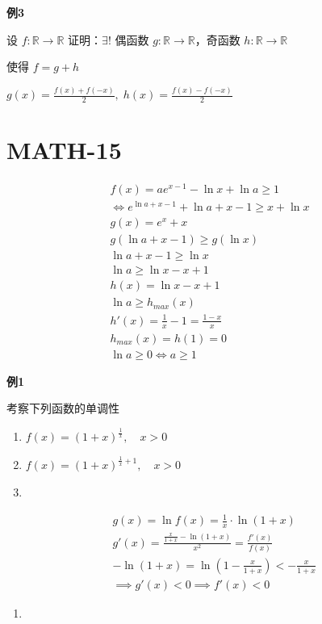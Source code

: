 \textbf{例3}

设 \(f:\mathbb{R}\to \mathbb{R}\) 证明：\(\exists!\) 偶函数
\(g:\mathbb{R}\to \mathbb{R}\)，奇函数 \(h:\mathbb{R}\to \mathbb{R}\)

使得 \(f=g+h\)

\(g(x)=\frac{f(x)+f(-x)}{2}, \; h(x)=\frac{f(x)-f(-x)}{2}\)

\section{MATH-15}\label{math-15}

\[
\begin{aligned}
f(x)=ae^{x-1}-\ln x+\ln a \geq 1 \\ 
\iff e ^{\ln a+x-1} +\ln a+x-1\geq x+\ln x\\
g(x)=e^{x}+x\\
g(\ln a+x-1)\geq g(\ln x)\\
\ln a+x-1\geq \ln x\\
\ln a\geq \ln x-x+1\\
h(x)=\ln x-x+1\\
\ln a\geq h_{max}(x)\\
h'(x)=\frac{1}{x}-1=\frac{1-x}{x}\\
h_{max}(x)=h(1)=0\\
\ln a\geq 0 \iff a\geq 1
\end{aligned}
\]

\textbf{例1}

考察下列函数的单调性

\begin{enumerate}
\def\labelenumi{\arabic{enumi}.}
\item
  \(f(x)=(1+x)^{\frac{1}{x}}, \quad x>0\)
\item
  \(f(x)=(1+x)^{\frac{1}{x}+1}, \quad x>0\)
\item
\end{enumerate}

\[
\begin{aligned}
&g(x) = \ln f(x) = \frac{1}{x} \cdot \ln (1+x)\\
&g'(x) = \frac{\frac{x}{1+x}-\ln(1+x)}{x^{2}} = \frac{f'(x)}{f(x)}\\
&-\ln(1+x)=\ln\left( 1-\frac{x}{1+x} \right)< -\frac{x}{1+x} \\
&\implies g'(x)<0 \implies f'(x)<0
\end{aligned}
\]

\begin{enumerate}
\def\labelenumi{\arabic{enumi}.}
\setcounter{enumi}{1}
\tightlist
\item
\end{enumerate}

